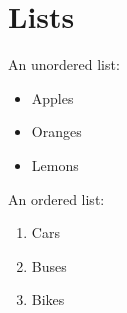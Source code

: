 
\chapter{Lists}

An unordered list:
\begin{itemize}
\item Apples
\item Oranges
\item Lemons
\end{itemize}

An ordered list:
\begin{enumerate}
\item Cars
\item Buses
\item Bikes
\end{enumerate}

\endinput

